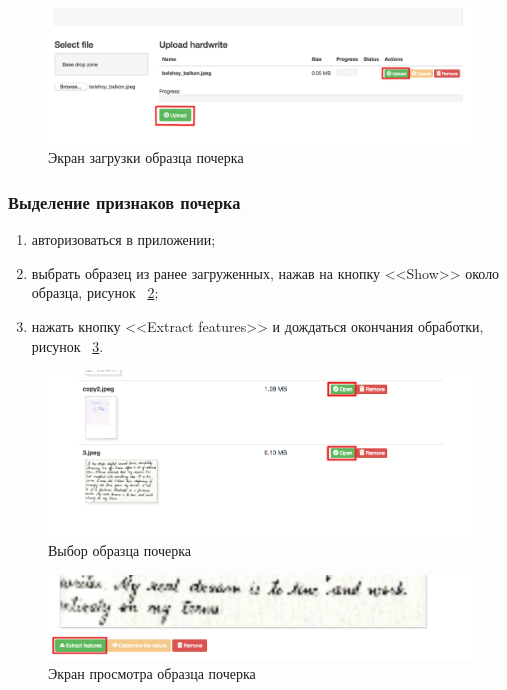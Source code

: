 \begin{figure}[ht]
    \centering
    \label{fig:manpage:client_man:upload_sample}
    \includegraphics[width=0.6\textheight]{figures/upload_sample_man.png}
    \caption{Экран загрузки образца почерка}
    \label{fig:manpage:client_man:upload_sample}
\end{figure}

\subsubsection{Выделение признаков почерка}
\label{sec:manpage:client_man:features}
\begin{enumerate}
    \item[1)] авторизоваться в приложении;
    \item[2)] выбрать образец из ранее загруженных, нажав на кнопку <<Show>> около образца, рисунок ~\ref{fig:manpage:client_man:show_button};
    \item[3)] нажать кнопку <<Extract features>> и дождаться окончания обработки, рисунок ~\ref{fig:manpage:client_man:extract_features}.
\end{enumerate}

\begin{figure}[ht]
    \centering
    \includegraphics[width=0.6\textheight]{figures/samples_open.png}
    \caption{Выбор образца почерка}
    \label{fig:manpage:client_man:show_button}
\end{figure}

\begin{figure}[ht]
    \centering
    \includegraphics[width=0.6\textheight]{figures/extract_features.png}
    \caption{Экран просмотра образца почерка}
    \label{fig:manpage:client_man:extract_features}
\end{figure}

